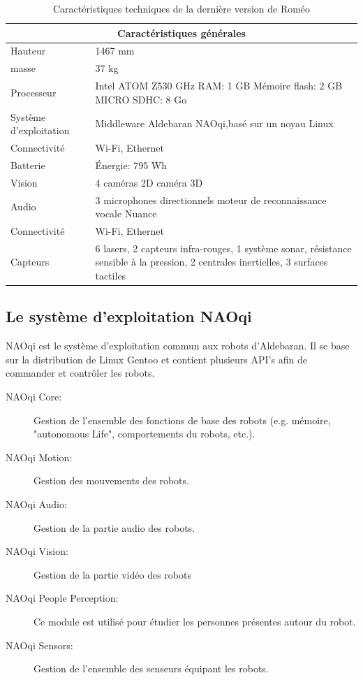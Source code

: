 \begin{table}[h]
	\begin{tabular}{ | l | p{8cm} | }
		\hline
		\multicolumn{2}{|c|}{Caractéristiques générales} \\
		\hline
		Hauteur & 1467 mm \\
		\hline 
		masse & 37 kg \\
		\hline
		Processeur & Intel ATOM Z530 \newline 1.6 GHz \newline RAM: 1 GB \newline Mémoire flash: 2 GB \newline MICRO SDHC: 8 Go  \\
		\hline
		Système d'exploitation & Middleware Aldebaran NAOqi,\newline basé sur un noyau Linux \\
		\hline
		Connectivité & Wi-Fi, Ethernet \\
		\hline
		Batterie & Énergie: 795 Wh \\
		\hline 
		Vision & 4 caméras 2D \newline 1 caméra 3D \\
		\hline
		Audio & 3 microphones directionnels \newline moteur de reconnaissance vocale Nuance  \\
		\hline
		Connectivité & Wi-Fi, Ethernet \\
		\hline
		Capteurs & 6 lasers, 2 capteurs infra-rouges, 1 système sonar, résistance sensible à la pression, 2 centrales inertielles, 3 surfaces tactiles \\
		\hline
	\end{tabular}
	\caption[Caractéristiques technique de Roméo]{Caractéristiques techniques de la dernière version de Roméo}
	\label {tab: Caractéristiques technique de Roméo}
\end{table}

\subsection{Le système d'exploitation NAOqi}
\label{Entreprise: Les produits: NAOqi}
NAOqi est le système d'exploitation commun aux robots d'Aldebaran. Il se base sur la distribution de Linux Gentoo et contient plusieurs API's afin de commander et contrôler les robots.
\begin{description}
	\item [NAOqi Core:] Gestion de l'ensemble des fonctions de base des robots (e.g. mémoire, "autonomous Life", comportements du robots, etc.).
	\item [NAOqi Motion:] Gestion des mouvements des robots.
	\item [NAOqi Audio:]  Gestion de la partie audio des robots.
	\item [NAOqi Vision:] Gestion de la partie vidéo des robots
	\item [NAOqi People Perception:] Ce module est utilisé pour étudier les personnes présentes autour du robot.
	\item [NAOqi Sensors:]  Gestion de l'ensemble des senseurs équipant les robots.
\end{description} 


